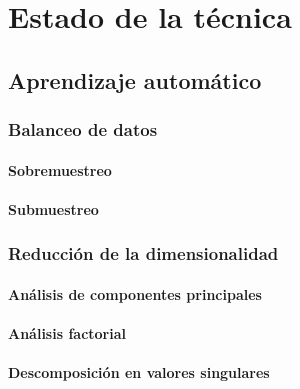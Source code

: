 \chapter{Estado de la técnica}
\label{ch:estado_tecnica}


\section{Aprendizaje automático}
\label{sec:aprend_auto}


\subsection{Balanceo de datos}
\label{subsec:balanceo}


\subsubsection{Sobremuestreo}
\label{subsubsec:oversampling}


\subsubsection{Submuestreo}
\label{subsubsec:undersampling}


\subsection{Reducción de la dimensionalidad}
\label{subsec:red_dim}


\subsubsection{Análisis de componentes principales}
\label{subsubsec:pca}


\subsubsection{Análisis factorial}
\label{subsubsec:fa}


\subsubsection{Descomposición en valores singulares}
	\label{subsubsec:svd}

